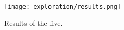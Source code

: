 





\begin{figure}
    \centering
    \texttt{[image: exploration/results.png]}
    \caption{Results of the five.}
    \label{fig:explor:lights_on_switches_vis}
\end{figure}